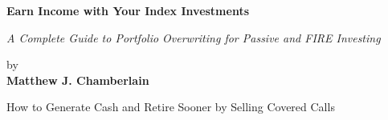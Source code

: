 \begin{titlepage}



\begin{center}
    \vspace*{0.1cm}
    
    \Huge
    \textbf{Earn Income with Your Index Investments}
    
    \vspace{0.75cm}
    \Large
    \emph{A Complete Guide to Portfolio Overwriting for Passive and FIRE Investing}
    
    \vspace{2cm}
    
    by\\
    \vspace{0.25cm}
    \textbf{Matthew J. Chamberlain}
    
    \vspace{4cm}
    How to Generate Cash and Retire Sooner by Selling Covered Calls
    
\end{center}

\end{titlepage}